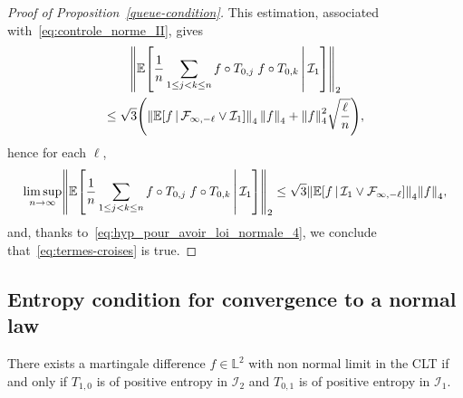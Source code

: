 \documentclass[AHL,Unicode,longabstracts,published]{cedram}
\newcommand*\bbL{\mathbb{L}}
\newcommand{\bbE}{\mathbb{E}}
\newcommand{\E}[1]{\bbE\left[#1\right]}
\newcommand*\I{\mathcal{I}}
\newcommand*\F{\mathcal{F}}
\newcommand{\norm}[1]{\left\lVert #1\right\rVert}
\renewcommand*{\to}{\mathchoice{\longrightarrow}{\rightarrow}{\rightarrow}{\rightarrow}}
\let\originalleft\left
\let\originalright\right
\renewcommand{\left}{\mathopen{}\mathclose\bgroup\originalleft}
\renewcommand{\right}{\aftergroup\egroup\originalright}
\begin{document}
\begin{proof}[Proof of Proposition~\ref{queue-condition}]
This estimation, associated with~\eqref{eq:controle_norme_II}, gives
\begin{multline*}
\norm{\E{\frac1n\sum_{1\leq j< k\leq n}f\circ T_{0,j}\;f\circ T_{0,k}\,\middle|\,\I_1}}_2
\\
\leq\sqrt3\left(\norm{\E{f \,\middle|\,\F_{\infty,-\ell}\vee\I_1}}_4\,\norm{f}_4+ \norm{f}_4^2\sqrt{\frac{\ell}{n}}\right),
\end{multline*}
hence for each $\ell$,
\begin{equation*}
\limsup_{n\to\infty}\norm{\E{\frac1n\sum_{1\leq j< k\leq n}f\circ T_{0,j}\;f\circ T_{0,k}\,\middle|\,\I_1}}_2\leq \sqrt{3}
\norm{\E{f \,\middle|\,\I_{1}\vee \F_{\infty, -\ell}}}_4\norm{f}_4,
\end{equation*}
and, thanks to~\eqref{eq:hyp_pour_avoir_loi_normale_4}, we conclude that~\eqref{eq:termes-croises} is true.
\end{proof}
\subsection{Entropy condition for convergence to a normal law}\label{entropie}

\begin{theo}\label{pos-entropy}
There exists a martingale difference $f\in \bbL^2$ with non normal limit in the CLT if and only if $T_{1,0}$ is of positive entropy in $\I_2$ and $T_{0,1}$ is of positive entropy in $\I_1$.
\end{theo}
\end{document}
